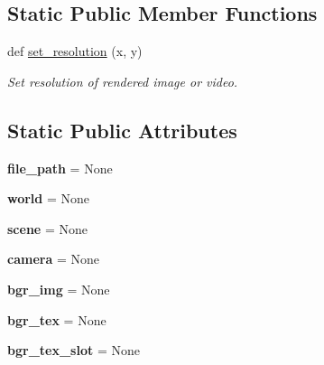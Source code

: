 \subsection*{Static Public Member Functions}
\begin{DoxyCompactItemize}
\item 
def \hyperlink{classhandler_1_1BlenderHandler_aaf2a3e4a6e5ecd003415d5543143767e}{set\+\_\+resolution} (x, y)
\begin{DoxyCompactList}\small\item\em Set resolution of rendered image or video. \end{DoxyCompactList}\end{DoxyCompactItemize}
\subsection*{Static Public Attributes}
\begin{DoxyCompactItemize}
\item 
{\bfseries file\+\_\+path} = None\hypertarget{classhandler_1_1BlenderHandler_ab4129f1d57bcef67c29f9959b690f890}{}\label{classhandler_1_1BlenderHandler_ab4129f1d57bcef67c29f9959b690f890}

\item 
{\bfseries world} = None\hypertarget{classhandler_1_1BlenderHandler_a6ed4f22d3f26a59dc74cea2bdd7669f3}{}\label{classhandler_1_1BlenderHandler_a6ed4f22d3f26a59dc74cea2bdd7669f3}

\item 
{\bfseries scene} = None\hypertarget{classhandler_1_1BlenderHandler_a71ab33d3e6cbfa1ecd5fa8b3bb57b4e0}{}\label{classhandler_1_1BlenderHandler_a71ab33d3e6cbfa1ecd5fa8b3bb57b4e0}

\item 
{\bfseries camera} = None\hypertarget{classhandler_1_1BlenderHandler_aa8b6ac7800ecf397f96f6c520391ec89}{}\label{classhandler_1_1BlenderHandler_aa8b6ac7800ecf397f96f6c520391ec89}

\item 
{\bfseries bgr\+\_\+img} = None\hypertarget{classhandler_1_1BlenderHandler_a40868d51142328068c0b060ca59761b4}{}\label{classhandler_1_1BlenderHandler_a40868d51142328068c0b060ca59761b4}

\item 
{\bfseries bgr\+\_\+tex} = None\hypertarget{classhandler_1_1BlenderHandler_a4893c39b2c6609495464c6fe04c476cf}{}\label{classhandler_1_1BlenderHandler_a4893c39b2c6609495464c6fe04c476cf}

\item 
{\bfseries bgr\+\_\+tex\+\_\+slot} = None\hypertarget{classhandler_1_1BlenderHandler_a9c268946601a4973309ac2a03dcb57c9}{}\label{classhandler_1_1BlenderHandler_a9c268946601a4973309ac2a03dcb57c9}

\end{DoxyCompactItemize}


